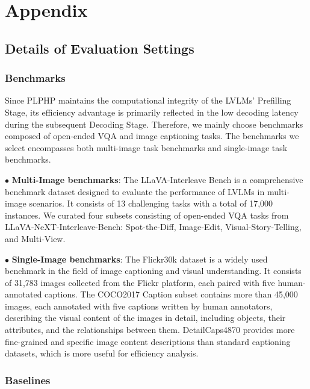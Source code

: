 \cleardoublepage
\section{Appendix}

\subsection{Details of Evaluation Settings}\label{asec:eval-setting}

\subsubsection{Benchmarks}\label{asec:eval-setting-bench}

Since PLPHP maintains the computational integrity of the LVLMs' Prefilling Stage, its efficiency advantage is primarily reflected in the low decoding latency during the subsequent Decoding Stage. Therefore, we mainly choose benchmarks composed of open-ended VQA and image captioning tasks. The benchmarks we select encompasses both multi-image task benchmarks and single-image task benchmarks.

$\bullet$ \textbf{Multi-Image benchmarks}: The LLaVA-Interleave Bench is a comprehensive benchmark dataset designed to evaluate the performance of LVLMs in multi-image scenarios. It consists of 13 challenging tasks with a total of 17,000 instances. We curated four subsets consisting of open-ended VQA tasks from LLaVA-NeXT-Interleave-Bench: Spot-the-Diff, Image-Edit, Visual-Story-Telling, and Multi-View.

$\bullet$ \textbf{Single-Image benchmarks}: The Flickr30k dataset is a widely used benchmark in the field of image captioning and visual understanding. It consists of 31,783 images collected from the Flickr platform, each paired with five human-annotated captions. The COCO2017 Caption subset contains more than 45,000 images, each annotated with five captions written by human annotators, describing the visual content of the images in detail, including objects, their attributes, and the relationships between them. DetailCaps4870 provides more fine-grained and specific image content descriptions than standard captioning datasets, which is more useful for efficiency analysis. 

\subsubsection{Baselines}\label{asec:eval-setting-baseline}

